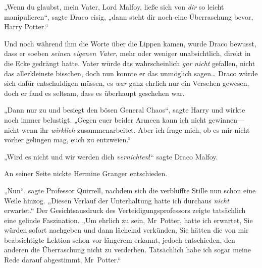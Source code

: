 „Wenn du glaubst, mein Vater, Lord Malfoy, ließe sich von \emph{dir} so leicht manipulieren“, sagte Draco eisig, „dann steht dir noch eine Überraschung bevor, Harry Potter.“

Und noch während ihm die Worte über die Lippen kamen, wurde Draco bewusst, dass er soeben \emph{seinen eigenen Vater}, mehr oder weniger unabsichtlich, direkt in die Ecke gedrängt hatte. Vater würde das wahrscheinlich \emph{gar} \emph{nicht} gefallen, nicht das allerkleinste bisschen, doch nun konnte er das unmöglich sagen… Draco würde sich dafür entschuldigen müssen, es \emph{war} ganz ehrlich nur ein Versehen gewesen, doch er fand es seltsam, dass es überhaupt geschehen war.

„Dann nur zu und besiegt den bösen General Chaos“, sagte Harry und wirkte noch immer belustigt. „Gegen euer beider Armeen kann ich nicht gewinnen—nicht wenn ihr \emph{wirklich} zusammenarbeitet. Aber ich frage mich, ob es mir nicht vorher gelingen mag, euch zu entzweien.“

„Wird es nicht und wir werden dich \emph{vernichten}!“ sagte Draco Malfoy.

An seiner Seite nickte Hermine Granger entschieden.

„Nun“, sagte Professor Quirrell, nachdem sich die verblüffte Stille nun schon eine Weile hinzog. „Diesen Verlauf der Unterhaltung hatte ich durchaus \emph{nicht} erwartet.“ Der Gesichtsausdruck des Verteidigungsprofessors zeigte tatsächlich eine gelinde Faszination. „Um ehrlich zu sein, Mr~Potter, hatte ich erwartet, Sie würden sofort nachgeben und dann lächelnd verkünden, Sie hätten die von mir beabsichtigte Lektion schon vor längerem erkannt, jedoch entschieden, den anderen die Überraschung nicht zu verderben. Tatsächlich habe ich sogar meine Rede darauf abgestimmt, Mr~Potter.“

